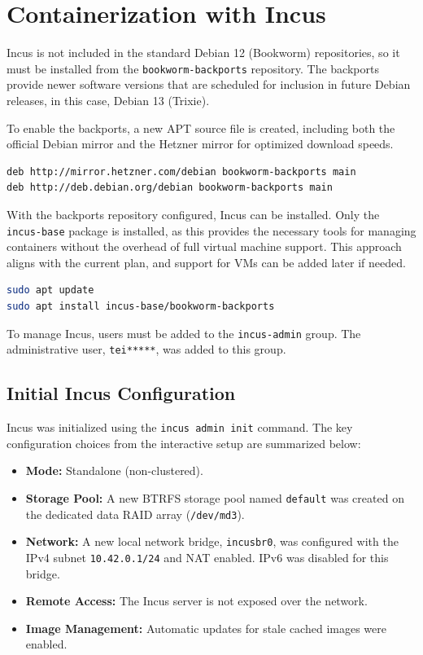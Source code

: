 \section{Containerization with Incus}

Incus is not included in the standard Debian 12 (Bookworm) repositories, so it must be installed from the \texttt{bookworm-backports} repository. The backports provide newer software versions that are scheduled for inclusion in future Debian releases, in this case, Debian 13 (Trixie).

To enable the backports, a new APT source file is created, including both the official Debian mirror and the Hetzner mirror for optimized download speeds.

\begin{lstlisting}[language=bash,caption={APT sources list to enable the bookworm-backports repository.}]
deb http://mirror.hetzner.com/debian bookworm-backports main
deb http://deb.debian.org/debian bookworm-backports main
\end{lstlisting}

With the backports repository configured, Incus can be installed. Only the \texttt{incus-base} package is installed, as this provides the necessary tools for managing containers without the overhead of full virtual machine support. This approach aligns with the current plan, and support for VMs can be added later if needed.

\begin{lstlisting}[language=bash,caption={Installing the Incus server from Debian backports.}]
sudo apt update
sudo apt install incus-base/bookworm-backports
\end{lstlisting}

To manage Incus, users must be added to the \texttt{incus-admin} group. The administrative user, \texttt{tei*****}, was added to this group.

\subsection*{Initial Incus Configuration}

Incus was initialized using the \texttt{incus admin init} command. The key configuration choices from the interactive setup are summarized below:
\begin{itemize}
    \item \textbf{Mode:} Standalone (non-clustered).
    \item \textbf{Storage Pool:} A new BTRFS storage pool named \texttt{default} was created on the dedicated data RAID array (\texttt{/dev/md3}).
    \item \textbf{Network:} A new local network bridge, \texttt{incusbr0}, was configured with the IPv4 subnet \texttt{10.42.0.1/24} and NAT enabled. IPv6 was disabled for this bridge.
    \item \textbf{Remote Access:} The Incus server is not exposed over the network.
    \item \textbf{Image Management:} Automatic updates for stale cached images were enabled.
\end{itemize}


